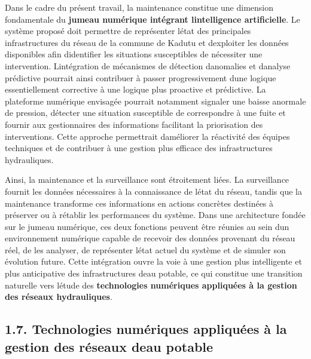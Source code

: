 \documentclass[12pt,a4paper,oneside]{report}
\begin{document}
Dans le cadre du présent travail, la maintenance constitue une dimension
fondamentale du \textbf{jumeau numérique intégrant
l\textquotesingle intelligence artificielle}. Le système proposé doit
permettre de représenter l\textquotesingle état des principales
infrastructures du réseau de la commune de Kadutu et
d\textquotesingle exploiter les données disponibles afin
d\textquotesingle identifier les situations susceptibles de nécessiter
une intervention. L\textquotesingle intégration de mécanismes de
détection d\textquotesingle anomalies et d\textquotesingle analyse
prédictive pourrait ainsi contribuer à passer progressivement
d\textquotesingle une logique essentiellement corrective à une logique
plus proactive et prédictive. La plateforme numérique envisagée pourrait
notamment signaler une baisse anormale de pression, détecter une
situation susceptible de correspondre à une fuite et fournir aux
gestionnaires des informations facilitant la priorisation des
interventions. Cette approche permettrait d\textquotesingle améliorer la
réactivité des équipes techniques et de contribuer à une gestion plus
efficace des infrastructures hydrauliques.

Ainsi, la maintenance et la surveillance sont étroitement liées. La
surveillance fournit les données nécessaires à la connaissance de
l\textquotesingle état du réseau, tandis que la maintenance transforme
ces informations en actions concrètes destinées à préserver ou à
rétablir les performances du système. Dans une architecture fondée sur
le jumeau numérique, ces deux fonctions peuvent être réunies au sein
d\textquotesingle un environnement numérique capable de recevoir des
données provenant du réseau réel, de les analyser, de représenter
l\textquotesingle état actuel du système et de simuler son évolution
future. Cette intégration ouvre la voie à une gestion plus intelligente
et plus anticipative des infrastructures d\textquotesingle eau potable,
ce qui constitue une transition naturelle vers l\textquotesingle étude
des \textbf{technologies numériques appliquées à la gestion des réseaux
hydrauliques}.

\subsection{1.7. Technologies numériques appliquées à la gestion des
réseaux d\textquotesingle eau
potable}\label{technologies-numuxe9riques-appliquuxe9es-uxe0-la-gestion-des-ruxe9seaux-deau-potable}
\end{document}
